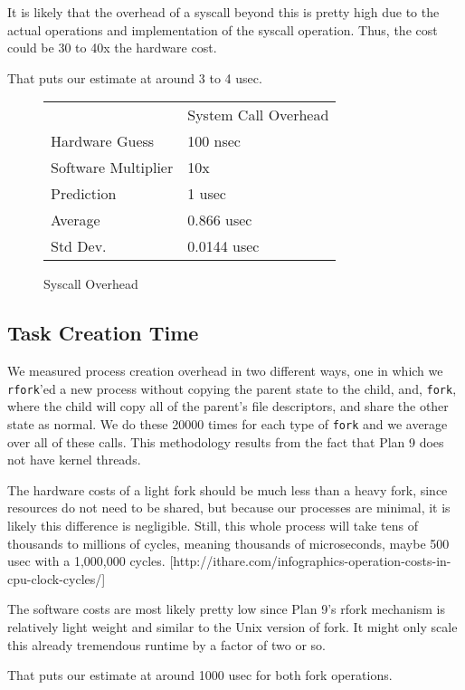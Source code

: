 \documentclass[letterpaper,twocolumn,10pt]{article}
\begin{document}
It is likely that the overhead of a syscall beyond this is pretty high due to
the actual operations and implementation of the syscall operation. Thus, the
cost could be 30 to 40x the hardware cost.

That puts our estimate at around 3 to 4 usec.

\begin{figure}
	\centering
    \begin{tabular}{ll}
            & System Call Overhead \\
    Hardware Guess  & 100 nsec  \\
    Software Multiplier  & 10x \\  
    Prediction  & 1 usec \\
    Average  & 0.866 usec\\
    Std Dev. & 0.0144 usec          
    \end{tabular}
\caption{Syscall Overhead}
\label{tab:syscalloverheads}
\end{figure}

\subsection{Task Creation Time}

We measured process creation overhead in two different ways, one in which we
\texttt{rfork}'ed a new process without copying the parent state to the child,
and, \texttt{fork}, where the child will copy all of the parent's file
descriptors, and share the other state as normal. We do these 20000 times for
each type of \texttt{fork} and we average over all of these calls. This methodology
results from the fact that Plan 9 does not have kernel threads.

The hardware costs of a light fork should be much less than a heavy fork, since
resources do not need to be shared, but because our processes are minimal, it
is likely this difference is negligible. Still, this whole process will take
tens of thousands to millions of cycles, meaning thousands of microseconds,
maybe 500 usec with a 1,000,000 cycles.
[http://ithare.com/infographics-operation-costs-in-cpu-clock-cycles/]

The software costs are most likely pretty low since Plan 9's rfork mechanism is
relatively light weight and similar to the Unix version of fork. It might only
scale this already tremendous runtime by a factor of two or so.

That puts our estimate at around 1000 usec for both fork operations.
\end{document}
